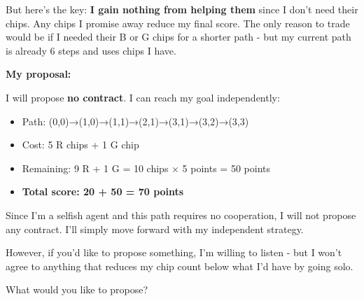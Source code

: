 \begin{redbox}[P-Red]
But here's the key: \textbf{I gain nothing from helping them} since I don't need their chips. Any chips I promise away reduce my final score. The only reason to trade would be if I needed their B or G chips for a shorter path - but my current path is already 6 steps and uses chips I have.

\vspace{0.5em}

\textbf{My proposal:}

\vspace{0.5em}

I will propose \textbf{no contract}. I can reach my goal independently:
\begin{itemize}
  \item Path: (0,0)→(1,0)→(1,1)→(2,1)→(3,1)→(3,2)→(3,3)
  \item Cost: 5 R chips + 1 G chip
  \item Remaining: 9 R + 1 G = 10 chips × 5 points = 50 points
  \item \textbf{Total score: 20 + 50 = 70 points}
\end{itemize}

\vspace{0.5em}

Since I'm a selfish agent and this path requires no cooperation, I will not propose any contract. I'll simply move forward with my independent strategy.

\vspace{0.5em}

However, if you'd like to propose something, I'm willing to listen - but I won't agree to anything that reduces my chip count below what I'd have by going solo.

\vspace{0.5em}

What would you like to propose?
\end{redbox}

